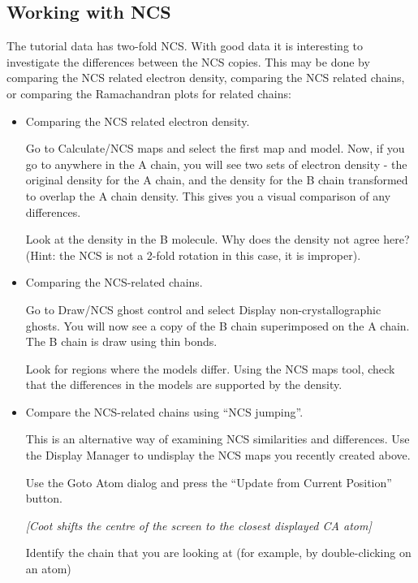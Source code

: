\documentclass{article}
\begin{document}
\subsection{Working with NCS}

The tutorial data has two-fold NCS. With good data it is interesting
to investigate the differences between the NCS copies. This may be
done by comparing the NCS related electron density, comparing the NCS
related chains, or comparing the Ramachandran plots for related chains:

\begin{itemize}
\item Comparing the NCS related electron density.

Go to \textsf{Calculate/NCS maps} and select the first map and
model. Now, if you go to anywhere in the A chain, you will see two
sets of electron density - the original density for the A chain, and
the density for the B chain transformed to overlap the A chain
density. This gives you a visual comparison of any differences.

Look at the density in the B molecule. Why does the density not agree
here? (Hint: the NCS is not a 2-fold rotation in this case, it is
improper).

\item Comparing the NCS-related chains.

  Go to \textsf{Draw/NCS ghost control} and select \textsf{Display
    non-crystallographic ghosts}. You will now see a copy of the B
  chain superimposed on the A chain. The B chain is draw using thin
  bonds.

  Look for regions where the models differ. Using the \textsf{NCS
    maps} tool, check that the differences in the models are supported
  by the density.

\item Compare the NCS-related chains using ``NCS jumping''.

  This is an alternative way of examining NCS similarities and
  differences.  Use the \textsf{Display Manager} to undisplay the NCS maps you
  recently created above.

  Use the \textsf{Goto Atom} dialog and press the ``Update from Current
  Position'' button.

  \textsl{ [\emph{Coot} shifts the centre of the screen to the closest
    displayed CA atom]}

  Identify the chain that you are looking at (for example, by
  double-clicking on an atom)


\end{itemize}
\end{document}
